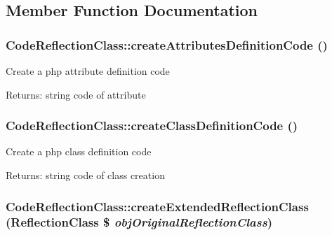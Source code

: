 \subsection{Member Function Documentation}
\hypertarget{class_code_reflection_class_4bf8009246a6e2c63ff61c6c2098fbf9}{
\subsubsection[{createAttributesDefinitionCode}]{\setlength{\rightskip}{0pt plus 5cm}CodeReflectionClass::createAttributesDefinitionCode ()}}
\label{class_code_reflection_class_4bf8009246a6e2c63ff61c6c2098fbf9}


Create a php attribute definition code

\begin{Desc}
\item[Returns:]string code of attribute \end{Desc}
\hypertarget{class_code_reflection_class_a7ab3478fc4d4d35708852357cfaddc7}{
\subsubsection[{createClassDefinitionCode}]{\setlength{\rightskip}{0pt plus 5cm}CodeReflectionClass::createClassDefinitionCode ()}}
\label{class_code_reflection_class_a7ab3478fc4d4d35708852357cfaddc7}


Create a php class definition code

\begin{Desc}
\item[Returns:]string code of class creation \end{Desc}
\hypertarget{class_code_reflection_class_496631cb5814727379cdacb689e4c40a}{
\subsubsection[{createExtendedReflectionClass}]{\setlength{\rightskip}{0pt plus 5cm}CodeReflectionClass::createExtendedReflectionClass (ReflectionClass \$ {\em objOriginalReflectionClass})}}
\label{class_code_reflection_class_496631cb5814727379cdacb689e4c40a}


